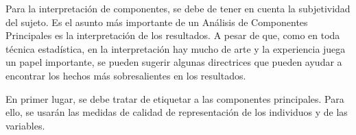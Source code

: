  Para la interpretación de componentes, se debe de tener en cuenta la subjetividad del sujeto. 
 Es el asunto más importante de un Análisis de Componentes Principales es la interpretación de los resultados. A pesar de que, como en toda técnica estadística, en la interpretación hay mucho de arte y la experiencia juega un papel importante, se pueden sugerir algunas directrices que pueden ayudar a encontrar los hechos más sobresalientes en los resultados.

En primer lugar, se debe tratar de etiquetar a las componentes principales. Para ello, se usarán las medidas de calidad de representación de los individuos y de las variables. \cite{CastilloGonzalez}
 
